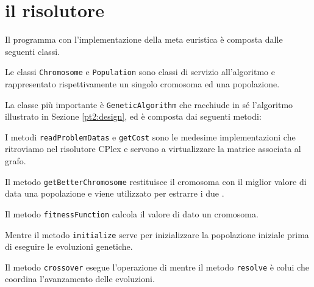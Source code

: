 %
%
\section[Il risolutore]{il risolutore}
\label{pt2:solver}
Il programma con l'implementazione della meta euristica è composta dalle seguenti classi.
\newpage


Le classi \texttt{Chromosome} e \texttt{Population} sono classi di servizio all'algoritmo e rappresentato rispettivamente un singolo cromosoma ed una popolazione.

La classe più importante è \texttt{GeneticAlgorithm} che racchiude in sé l'algoritmo illustrato in Sezione \ref{pt2:design}, ed è composta dai seguenti metodi:


I metodi \texttt{readProblemDatas} e \texttt{getCost} sono le medesime implementazioni che ritroviamo nel risolutore CPlex e servono a virtualizzare la matrice associata al grafo.

Il metodo \texttt{getBetterChromosome} restituisce il cromosoma con il miglior valore di  data una popolazione e viene utilizzato per estrarre i due .

Il metodo \texttt{fitnessFunction} calcola il valore di  dato un cromosoma.

Mentre il metodo \texttt{initialize} serve per inizializzare la popolazione iniziale prima di eseguire le evoluzioni genetiche.

Il metodo \texttt{crossover} esegue l'operazione di  mentre il metodo \texttt{resolve} è colui che coordina l'avanzamento delle evoluzioni.